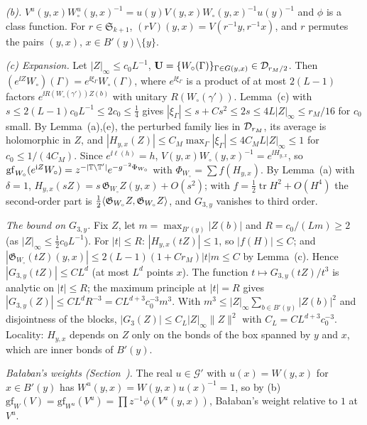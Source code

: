 \begin{detail}
\begin{step}
\end{step}
\begin{step}
\emph{(b).} $V^u(y,x)W_\circ^u(y,x)^{-1}=u(y)V(y,x)W_\circ(y,x)^{-1}u(y)^{-1}$ and $\phi$ is a class function. For $r\in\mathfrak S_{k+1}$, $(rV)(y,x)=V(r^{-1}y,r^{-1}x)$, and $r$ permutes the pairs $(y,x)$, $x\in B'(y)\setminus\{y\}$.
\end{step}
\begin{step}
\emph{(c) Expansion.} Let $|Z|_\infty\le c_0L^{-1}$, $\mathbf U=\{W_\circ(\Gamma)\}_{\Gamma\in G(y,x)}\in\mathcal D_{r_M/2}$. Then $(e^{\ii Z}W_\circ)(\Gamma)=e^{\ii\xi_\Gamma}W_\circ(\Gamma)$, where $e^{\ii\xi_\Gamma}$ is a product of at most $2(L-1)$ factors $e^{\ii R(W_\circ(\gamma'))Z(b)}$ with unitary $R(W_\circ(\gamma'))$. Lemma~(c) with $s\le2(L-1)c_0L^{-1}\le2c_0\le\frac14$ gives $|\xi_\Gamma|\le s+Cs^2\le2s\le4L|Z|_\infty\le r_M/16$ for $c_0$ small. By Lemma~(a),(e), the perturbed family lies in $\mathcal D_{r_M}$, its average is holomorphic in $Z$, and $|H_{y,x}(Z)|\le C_M\max_\Gamma|\xi_\Gamma|\le4C_ML|Z|_\infty\le1$ for $c_0\le1/(4C_M)$. Since $e^{\ii\ell(h)}=h$, $V(y,x)W_\circ(y,x)^{-1}=e^{\ii H_{y,x}}$, so $\mathrm{gf}_{W_\circ}(e^{\mathrm i Z}W_\circ)=z^{-|\mathbb T\setminus\mathbb T'|}e^{-g^{-2}\Phi_{W_\circ}}$ with $\Phi_{W_\circ}=\sum f(H_{y,x})$. By Lemma~(a) with $\delta=1$, $H_{y,x}(sZ)=s\,\mathfrak G_{W_\circ}Z(y,x)+O(s^2)$; with $f=\frac12\operatorname{tr}H^2+O(H^4)$ the second-order part is $\frac12\langle \mathfrak G_{W_\circ}Z,\mathfrak G_{W_\circ}Z\rangle$, and $G_{3,y}$ vanishes to third order.
\end{step}
\begin{step}
\emph{The bound on $G_{3,y}$.} Fix $Z$, let $m=\max_{B'(y)}|Z(b)|$ and $R=c_0/(Lm)\ge2$ (as $|Z|_\infty\le\frac12c_0L^{-1}$). For $|t|\le R$: $|H_{y,x}(tZ)|\le1$, so $|f(H)|\le C$; and $|\mathfrak G_{W_\circ}(tZ)(y,x)|\le2(L-1)(1+Cr_M)|t|m\le C$ by Lemma~(c). Hence $|G_{3,y}(tZ)|\le CL^d$ (at most $L^d$ points $x$). The function $t\mapsto G_{3,y}(tZ)/t^3$ is analytic on $|t|\le R$; the maximum principle at $|t|=R$ gives $|G_{3,y}(Z)|\le CL^dR^{-3}=CL^{d+3}c_0^{-3}m^3$. With $m^3\le|Z|_\infty\sum_{b\in B'(y)}|Z(b)|^2$ and disjointness of the blocks, $|G_3(Z)|\le C_L|Z|_\infty\|Z\|^2$ with $C_L=CL^{d+3}c_0^{-3}$. Locality: $H_{y,x}$ depends on $Z$ only on the bonds of the box spanned by $y$ and $x$, which are inner bonds of $B'(y)$.
\end{step}
\begin{step}
\emph{Ba\l aban's weights (Section~).} The real $u\in\mathcal G'$ with $u(x)=W(y,x)$ for $x\in B'(y)$ has $W^u(y,x)=W(y,x)u(x)^{-1}=1$, so by (b) $\mathrm{gf}_W(V)=\mathrm{gf}_{W^u}(V^u)=\prod z^{-1}\phi(V^u(y,x))$, Ba\l aban's weight relative to $1$ at $V^u$.
\end{step}
\end{detail}


